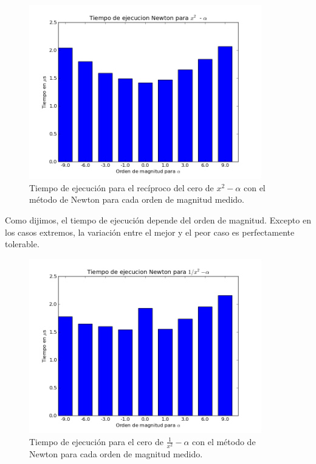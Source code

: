 \begin{figure}[H]
  \centering
    \includegraphics[width=0.9\textwidth]{../data/Tiempo metodo 0.png}
    \caption{Tiempo de ejecución para el recíproco del cero de $x^2 - \alpha$ con el método de Newton para cada orden de magnitud medido.}
    \label{tiempoMet0}
\end{figure}

Como dijimos, el tiempo de ejecución depende del orden de magnitud. Excepto en los casos extremos, la variación entre el mejor y el peor caso es perfectamente tolerable.

\begin{figure}[H]
  \centering
    \includegraphics[width=0.9\textwidth]{../data/Tiempo metodo 1.png}
    \caption{Tiempo de ejecución para el cero de $\frac{1}{x^2} - \alpha$ con el método de Newton para cada orden de magnitud medido.}
    \label{tiempoMet1}
\end{figure}

